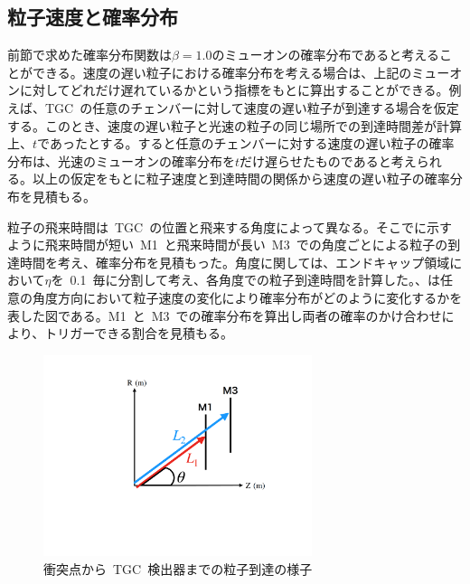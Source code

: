 \subsection{粒子速度と確率分布}\label{sec:prob}
前節で求めた確率分布関数は$\beta=1.0$のミューオンの確率分布であると考えることができる。速度の遅い粒子における確率分布を考える場合は、上記のミューオンに対してどれだけ遅れているかという指標をもとに算出することができる。例えば、TGC~の任意のチェンバーに対して速度の遅い粒子が到達する場合を仮定する。このとき、速度の遅い粒子と光速の粒子の同じ場所での到達時間差が計算上、$t$であったとする。すると任意のチェンバーに対する速度の遅い粒子の確率分布は、光速のミューオンの確率分布を$t$だけ遅らせたものであると考えられる。以上の仮定をもとに粒子速度と到達時間の関係から速度の遅い粒子の確率分布を見積もる。

粒子の飛来時間は~TGC~の位置と飛来する角度によって異なる。そこでに示すように飛来時間が短い~M1~と飛来時間が長い~M3~での角度ごとによる粒子の到達時間を考え、確率分布を見積もった。角度に関しては、エンドキャップ領域において$\eta$を~0.1~毎に分割して考え、各角度での粒子到達時間を計算した。、は任意の角度方向において粒子速度の変化により確率分布がどのように変化するかを表した図である。M1~と~M3~での確率分布を算出し両者の確率のかけ合わせにより、トリガーできる割合を見積もる。
\begin{figure}[H]
    \centering   
    \includegraphics[width=0.7\textwidth,page=1]{img/slide/BX.pdf}
    \caption{衝突点から~TGC~検出器までの粒子到達の様子}\label{fig:velo}
\end{figure}

